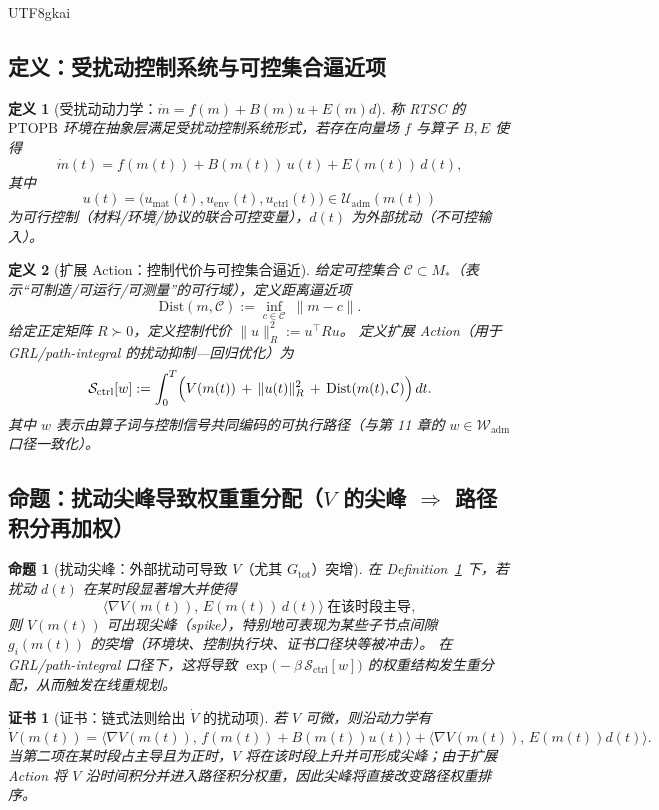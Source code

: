 \documentclass[12pt]{article}
\newtheorem{definition}{定义}[section]
\newtheorem{proposition}{命题}[section]
\newtheorem{certificate}{证书}[section]
\newcommand{\PTOPB}{\ensuremath{\mathrm{PTOPB}}}
\newcommand{\RTSC}{\textsf{RTSC}}
\begin{document}
\begin{CJK*}{UTF8}{gkai}
\subsection{定义：受扰动控制系统与可控集合逼近项}

\begin{definition}[受扰动动力学：$\dot m=f(m)+B(m)u+E(m)d$]
\label{def:rtsc-disturbed-dynamics}
称 \RTSC{} 的 \PTOPB{} 环境在抽象层满足受扰动控制系统形式，若存在向量场 $f$ 与算子 $B,E$ 使得
\[
\dot m(t)=f(m(t)) + B(m(t))\,u(t) + E(m(t))\,d(t),
\]
其中
\[
u(t)=\bigl(u_{\mathrm{mat}}(t),u_{\mathrm{env}}(t),u_{\mathrm{ctrl}}(t)\bigr)\in\mathcal{U}_{\mathrm{adm}}(m(t))
\]
为可行控制（材料/环境/协议的联合可控变量），$d(t)$ 为外部扰动（不可控输入）。
\end{definition}

\begin{definition}[扩展 Action：控制代价与可控集合逼近]
\label{def:rtsc-control-action}
给定可控集合 $\mathcal{C}\subset M_\ast$（表示“可制造/可运行/可测量”的可行域），定义距离逼近项
\[
\mathrm{Dist}(m,\mathcal{C}):=\inf_{c\in\mathcal{C}}\ \|m-c\|.
\]
给定正定矩阵 $R\succ 0$，定义控制代价 $\|u\|_R^2:=u^\top R u$。
定义扩展 Action（用于 GRL/path-integral 的扰动抑制—回归优化）为
\[
\mathcal{S}_{\mathrm{ctrl}}[w]
:=
\int_{0}^{T}\Bigl(
V(m(t))
\,+\,
\|u(t)\|_R^2
\,+\,
\mathrm{Dist}(m(t),\mathcal{C})
\Bigr)\,dt.
\]
其中 $w$ 表示由算子词与控制信号共同编码的可执行路径（与第 11 章的 $w\in\mathcal{W}_{\mathrm{adm}}$ 口径一致化）。
\end{definition}

\subsection{命题：扰动尖峰导致权重重分配（$V$ 的尖峰 $\Rightarrow$ 路径积分再加权）}

\begin{proposition}[扰动尖峰：外部扰动可导致 $V$（尤其 $G_{\mathrm{tot}}$）突增]
\label{prop:rtsc-disturbance-spike}
在 Definition~\ref{def:rtsc-disturbed-dynamics} 下，若扰动 $d(t)$ 在某时段显著增大并使得
\[
\langle \nabla V(m(t)),\,E(m(t))\,d(t)\rangle\ \text{在该时段主导},
\]
则 $V(m(t))$ 可出现尖峰（spike），特别地可表现为某些子节点间隙 $g_i(m(t))$ 的突增（环境块、控制执行块、证书口径块等被冲击）。
在 GRL/path-integral 口径下，这将导致 $\exp\!\bigl(-\beta\,\mathcal{S}_{\mathrm{ctrl}}[w]\bigr)$ 的权重结构发生重分配，从而触发在线重规划。
\end{proposition}

\begin{certificate}[证书：链式法则给出 $\dot V$ 的扰动项]
\label{cert:rtsc-disturbance-spike}
若 $V$ 可微，则沿动力学有
\[
\dot V(m(t))=\langle \nabla V(m(t)),\,f(m(t))+B(m(t))u(t)\rangle+\langle \nabla V(m(t)),\,E(m(t))d(t)\rangle.
\]
当第二项在某时段占主导且为正时，$V$ 将在该时段上升并可形成尖峰；由于扩展 Action 将 $V$ 沿时间积分并进入路径积分权重，因此尖峰将直接改变路径权重排序。
\end{certificate}


\end{CJK*}
\end{document}
